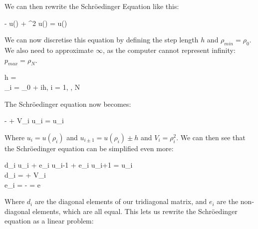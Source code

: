 \documentclass{article}
\begin{document}
			We can then rewrite the Schröedinger Equation like this:
			\begin{flalign*}
				-  u(\rho) + \rho^2 u(\rho) = \lambda u(\rho)
			\end{flalign*}

			We can now discretise this equation by defining the step length $h$ and $\rho_{min}=\rho_0$.
			We also need to approximate $\infty$, as the computer cannot represent infinity: $p_{max} = \rho_N$.
			\begin{flalign*}
				h = \frac{\rho_N - \rho_0}{N}\\
				\rho_i = \rho_0 + ih, \qquad i = 1, \hdots, N
			\end{flalign*}

			The Schröedinger equation now becomes: 
			\begin{flalign*}
				-  + V_i u_i = \lambda u_i
			\end{flalign*}

			Where $u_i = u(\rho_i)$ and $u_{i\pm 1} = u(\rho_i) \pm h$ and $V_i = \rho_i^2$.
			We can then see that the Schröedinger equation can be simplified even more:
			\begin{flalign*}
				d_i u_i + e_i u_{i-1} + e_i u_{i+1} = \lambda u_i\\
				d_i = \frac{2}{h^2} + V_i\\
				e_i = - \frac{1}{h^2} = e
			\end{flalign*}

			Where $d_i$ are the diagonal elements of our tridiagonal matrix, and $e_i$ are
			the non-diagonal elements, which are all equal.
			This lets us rewrite the Schröedinger equation as a linear problem:
\end{document}
